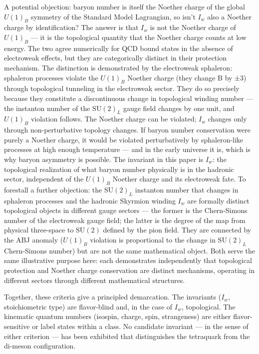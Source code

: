 \documentclass[12pt,a4paper]{article}
\begin{document}
A potential objection: baryon number is itself the Noether charge of the
global \(U(1)_B\) symmetry of the Standard Model Lagrangian, so isn't
\(I_w\) also a Noether charge by identification? The answer is that
\(I_w\) is not the Noether charge of \(U(1)_B\) --- it is the
topological quantity that the Noether charge counts at low energy. The
two agree numerically for QCD bound states in the absence of electroweak
effects, but they are categorically distinct in their protection
mechanism. The distinction is demonstrated by the electroweak sphaleron:
sphaleron processes violate the \(U(1)_B\) Noether charge (they change B
by ±3) through topological tunneling in the electroweak sector. They do
so precisely because they constitute a discontinuous change in
topological winding number --- the instanton number of the
\(\mathrm{SU}(2)_L\) gauge field changes by one unit, and \(U(1)_B\)
violation follows. The Noether charge can be violated; \(I_w\) changes
only through non-perturbative topology changes. If baryon number
conservation were purely a Noether charge, it would be violated
perturbatively by sphaleron-like processes at high enough temperature
--- and in the early universe it is, which is why baryon asymmetry is
possible. The invariant in this paper is \(I_w\): the
topological realization of what baryon number physically is in the
hadronic sector, independent of the \(U(1)_B\) Noether charge and its
electroweak fate. To forestall a further objection: the
\(\mathrm{SU}(2)_L\) instanton number that changes in sphaleron
processes and the hadronic Skyrmion winding \(I_w\) are formally
distinct topological objects in different gauge sectors --- the former
is the Chern-Simons number of the electroweak gauge field; the latter is
the degree of the map from physical three-space to \(\mathrm{SU}(2)\)
defined by the pion field. They are connected by the ABJ anomaly
(\(U(1)_B\) violation is proportional to the change in
\(\mathrm{SU}(2)_L\) Chern-Simons number) but are not the same
mathematical object. Both serve the same illustrative purpose here: each
demonstrates independently that topological protection and Noether
charge conservation are distinct mechanisms, operating in different
sectors through different mathematical structures.

Together, these criteria give a principled demarcation. The invariants (\(I_w\), stoichiometric type) are flavor-blind and, in the
case of \(I_w\), topological. The kinematic quantum numbers (isospin,
charge, spin, strangeness) are either flavor-sensitive or label states
within a class. No candidate invariant --- in the
sense of either criterion --- has been exhibited that distinguishes the
tetraquark from the di-meson configuration.
\end{document}
